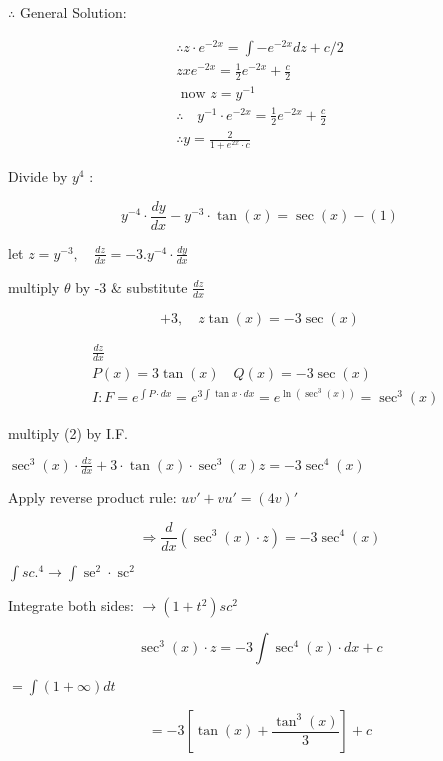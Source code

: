 \documentclass[12pt, a4paper]{article}
\begin{document}
$\therefore$ General Solution:

$$
	\begin{gathered}
		\therefore z \cdot e^{-2 x}=\int-e^{-2 x} d z+c / 2 \\
		z x e^{-2 x}=\frac{1}{2} e^{-2 x}+\frac{c}{2} \\
		\text{ now } z=y^{-1} \\
		\therefore \quad y^{-1} \cdot e^{-2 x}=\frac{1}{2} e^{-2 x}+\frac{c}{2} \\
		\therefore y=\frac{2}{1+e^{2 x} \cdot c}
	\end{gathered}
$$

Divide by $y^{4}$ :

$$
	y^{-4} \cdot \frac{d y}{d x}-y^{-3} \cdot \tan(x)=\sec (x)-(1)
$$

let $z=y^{-3}, \quad \frac{d z}{d x}=-3 . y^{-4} \cdot \frac{d y}{d x}$

multiply $\theta$ by -3 \& substitute $\frac{d z}{d x}$

$$
	+3, \quad z \tan(x)=-3 \sec (x)
$$

$$
	\begin{aligned}
		 & \frac{d z}{d x}                                                                                      \\
		 & P(x)=3 \tan(x) \quad Q(x)=-3 \sec (x)                                                                \\
		 & I: F=e^{\int P \cdot d x}=e^{3 \int \tan x \cdot d x}=e^{\ln \left(\sec ^{3}(x)\right)}=\sec ^{3}(x)
	\end{aligned}
$$

multiply (2) by I.F.

$\sec ^{3}(x) \cdot \frac{d z}{d x}+3 \cdot \tan(x) \cdot \sec ^{3}(x) z=-3 \sec ^{4}(x)$

Apply reverse product rule: $u v'+v u'=(4 v)'$

$$
	\Rightarrow \frac{d}{d x}\left(\sec ^{3}(x) \cdot z\right)=-3 \sec ^{4}(x)
$$

$\int s c .^{4} \rightarrow \int \operatorname{se}^{2} \cdot \operatorname{sc}^{2}$

Integrate both sides: $\rightarrow\left(1+t^{2}\right) s c^{2}$


\begin{equation*}
	\sec ^{3}(x) \cdot z=-3 \int \sec ^{4}(x) \cdot d x+c \tag{x}
\end{equation*}


$=\int(1+\infty) dt$

$$
	=-3\left[\tan(x)+\frac{\tan ^{3}(x)}{3}\right]+c
$$
\end{document}
